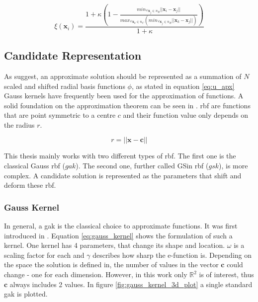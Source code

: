 \documentclass[./\jobname.tex]{subfiles}
\begin{document}
\begin{equation}
\label{eq:nc_weight}
\xi(\mathbf{x}_i) = \frac{1 + \kappa \left(1 - \frac{min_{\forall \mathbf{x}_j\in n_B}|| \mathbf{x}_i - \mathbf{x}_j ||}{max_{\forall\mathbf{x}_k \in n_C}(min_{\forall \mathbf{x}_j \in n_B} || \mathbf{x}_k - \mathbf{x}_j ||)}\right)}{1 + \kappa}
\end{equation}


\subsection{Candidate Representation}
\label{chap:candidate_rep}

As \cite{chaquet_using_2019} suggest, an approximate solution should be represented as a summation of $N$ scaled and shifted radial basis functions $\phi$, as stated in equation \eqref{eq:u_apx} Gauss kernels have frequently been used for the approximation of functions. A solid foundation on the approximation theorem can be seen in \cite{park_universal_1991}. \gls{rbf} are functions that are point symmetric to a centre $c$ and their function value only depends on the radius $r$. 

\begin{equation}
\label{eq: radius}
r = \left|\left|\mathbf{x} - \mathbf{c} \right|\right|
\end{equation}

This thesis mainly works with two different types of \gls{rbf}. The first one is the classical Gauss \gls{rbf} ($gak$). The second one, further called GSin \gls{rbf} ($gsk$), is more complex. A candidate solution is represented as the parameters that shift and deform these \gls{rbf}. 

\subsubsection{Gauss Kernel}
\label{chap:gauss_kernel}

In general, a \gls{gak} is the classical choice to approximate functions. It was first introduced in \cite{broomhead_multivariable_1988}. Equation \eqref{eq:gauss_kernel} shows the formulation of such a kernel. One kernel has 4 parameters, that change its shape and location. $\omega$ is a scaling factor for each and $\gamma$ describes how sharp the e-function is. Depending on the space the solution is defined in, the number of values in the vector $\mathbf{c}$ could change - one for each dimension. However, in this work only $\mathbb{R}^2$ is of interest, thus $\mathbf{c}$ always includes 2 values. In figure \ref{fig:gauss_kernel_3d_plot} a single standard \gls{gak} is plotted. 
\end{document}
